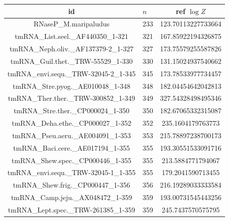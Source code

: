 \documentclass[11pt]{article}
\begin{document}
\begin{center}
\begin{tabular}{@{}clc@{}}
\toprule
id & $n$ & ref $\log Z$ \\
\midrule
RNaseP\_M.maripaludus & 233 & 123.70113227733664 \\
tmRNA\_List.seel.\_AF440350\_1-321 & 321 & 167.85922194326875 \\
tmRNA\_Neph.oliv.\_AF137379-2\_1-327 & 327 & 173.75579255587826 \\
tmRNA\_Guil.thet.\_TRW-55529\_1-330 & 330 & 131.15024937540662 \\
tmRNA\_envi.sequ.\_TRW-32045-2\_1-345 & 345 & 173.78533977734457 \\
tmRNA\_Stre.pyog.\_AE010048\_1-348 & 348 & 182.04454642042813 \\
tmRNA\_Ther.ther.\_TRW-300852\_1-349 & 349 & 327.54328498495346 \\
tmRNA\_Stre.ther.\_CP000024\_1-350 & 350 & 182.67065332315087 \\
tmRNA\_Deha.ethe.\_CP000027\_1-352 & 352 & 235.1604179763773 \\
tmRNA\_Pseu.aeru.\_AE004091\_1-353 & 353 & 215.78897238700173 \\
tmRNA\_Baci.cere.\_AE017194\_1-355 & 355 & 193.30551533091716 \\
tmRNA\_Shew.spec.\_CP000446\_1-355 & 355 & 213.5884771794067 \\
tmRNA\_envi.sequ.\_TRW-32045-1\_1-355 & 355 & 179.2041590713455 \\
tmRNA\_Shew.frig.\_CP000447\_1-356 & 356 & 216.19289033333584 \\
tmRNA\_Camp.jeju.\_AX048472\_1-359 & 359 & 193.00731545443256 \\
tmRNA\_Lept.spec.\_TRW-261385\_1-359 & 359 & 245.7437570575795 \\
\bottomrule
\end{tabular}
\end{center}
\end{document}
